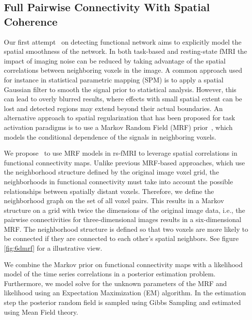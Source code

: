 \documentclass[12pt]{article}
\begin{document}
\subsection{Full Pairwise Connectivity With Spatial Coherence}\label{sec:highmrf}
Our first attempt~\cite{liu2010spatialCopy} on detecting functional network aims to
explicitly model the spatial smoothness of the network. In both task-based and
resting-state fMRI the impact of imaging noise can be reduced by taking
advantage of the spatial correlations between neighboring voxels in the image. A
common approach used for instance in statistical parametric mapping
(SPM)\cite{worsley_analysis_1995} is to apply a spatial Gaussian filter to
smooth the signal prior to statistical analysis. However, this can lead to
overly blurred results, where effects with small spatial extent can be lost and
detected regions may extend beyond their actual boundaries. An alternative
approach to spatial regularization that has been proposed for task activation
paradigms is to use a Markov Random Field (MRF)
prior~\cite{ou_spatial_2005,descombes_spatio-temporal_1998,descombes_fmri_1998,woolrich_fully_2004,cosman_exact_2004},
which models the conditional dependence of the signals in neighboring voxels.

We propose~\cite{liu2010spatialCopy} to use MRF models in rs-fMRI to leverage spatial
correlations in functional connectivity maps. Unlike previous MRF-based
approaches, which use the neighborhood structure defined by the original image
voxel grid, the neighborhoods in functional connectivity must take into account
the possible relationships between spatially distant voxels. Therefore, we
define the neighborhood graph on the set of all voxel pairs. This results in a
Markov structure on a grid with twice the dimensions of the original image data,
i.e., the pairwise connectivities for three-dimensional images results in a
six-dimensional MRF. The neighborhood structure is defined so that two voxels
are more likely to be connected if they are connected to each other's spatial
neighbors. See figure \ref{fig:6dmrf} for a illustrative view.


We combine the Markov prior on functional connectivity maps with a likelihood
model of the time series correlations in a posterior estimation problem.
Furthermore, we model solve for the unknown parameters of the MRF and likelihood
using an Expectation Maximization (EM) algorithm. In the estimation step the
posterior random field is sampled using Gibbs Sampling and estimated using Mean
Field theory.
\end{document}
